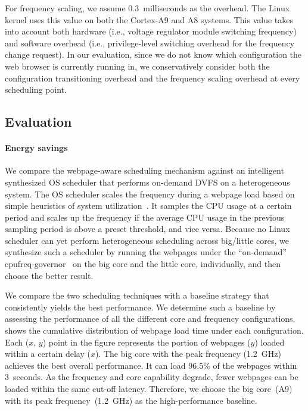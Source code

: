 For frequency scaling, we assume 0.3~milliseconds as the overhead. The Linux kernel uses this value on both the Cortex-A9 and A8 systems. This value takes into account both hardware (i.e., voltage regulator module switching frequency) and software overhead (i.e., privilege-level switching overhead for the frequency change request). In our evaluation, since we do not know which configuration the web browser is currently running in, we conservatively consider both the configuration transitioning overhead and the frequency scaling overhead at every scheduling point.

\subsection{Evaluation}
\label{sec:runtime:load:eval}

\paragraph{Energy savings} We compare the webpage-aware scheduling mechanism against an intelligent synthesized OS scheduler that performs on-demand DVFS on a heterogeneous system. The OS scheduler scales the frequency during a webpage load based on simple heuristics of system utilization~\cite{OS_DVFS1,OS_DVFS2}. It samples the CPU usage at a certain period and scales up the frequency if the average CPU usage in the previous sampling period is above a preset threshold, and vice versa. Because no Linux scheduler can yet perform heterogeneous scheduling across big/little cores, we synthesize such a scheduler by running the webpages under the ``on-demand'' cpufreq-governor~\cite{ondemand} on the big core and the little core, individually, and then choose the better result.

We compare the two scheduling techniques with a baseline strategy that consistently yields the best performance. We determine such a baseline by assessing the performance of all the different core and frequency configurations.  shows the cumulative distribution of webpage load time under each configuration. Each ($x$, $y$) point in the figure represents the portion of webpages ($y$) loaded within a certain delay ($x$). The big core with the peak frequency (1.2~GHz) achieves the best overall performance. It can load 96.5\% of the webpages within 3~seconds. As the frequency and core capability degrade, fewer webpages can be loaded within the same cut-off latency. Therefore, we choose the big core~(A9) with its peak frequency~(1.2~GHz) as the high-performance baseline.

